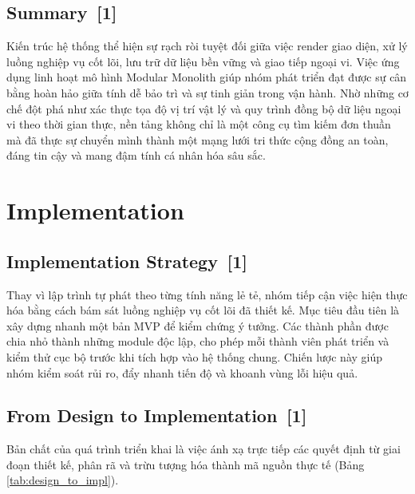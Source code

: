 \documentclass[12pt, a4paper]{article}
\begin{document}
\subsection[Summary]{Summary \,{\normalfont\small\textcolor{cyan!70!black}{[1]}}}
Kiến trúc hệ thống thể hiện sự rạch ròi tuyệt đối giữa việc render giao diện, xử lý luồng nghiệp vụ cốt lõi, lưu trữ dữ liệu bền vững và giao tiếp ngoại vi. Việc ứng dụng linh hoạt mô hình Modular Monolith giúp nhóm phát triển đạt được sự cân bằng hoàn hảo giữa tính dễ bảo trì và sự tinh giản trong vận hành. Nhờ những cơ chế đột phá như xác thực tọa độ vị trí vật lý và quy trình đồng bộ dữ liệu ngoại vi theo thời gian thực, nền tảng không chỉ là một công cụ tìm kiếm đơn thuần mà đã thực sự chuyển mình thành một mạng lưới tri thức cộng đồng an toàn, đáng tin cậy và mang đậm tính cá nhân hóa sâu sắc.
\section{Implementation}

\subsection[Implementation Strategy]{Implementation Strategy \,{\normalfont\small\textcolor{cyan!70!black}{[1]}}}
Thay vì lập trình tự phát theo từng tính năng lẻ tẻ, nhóm tiếp cận việc hiện thực hóa bằng cách bám sát luồng nghiệp vụ cốt lõi đã thiết kế. Mục tiêu đầu tiên là xây dựng nhanh một bản MVP để kiểm chứng ý tưởng. Các thành phần được chia nhỏ thành những module độc lập, cho phép mỗi thành viên phát triển và kiểm thử cục bộ trước khi tích hợp vào hệ thống chung. Chiến lược này giúp nhóm kiểm soát rủi ro, đẩy nhanh tiến độ và khoanh vùng lỗi hiệu quả.

\subsection[From Design to Implementation]{From Design to Implementation \,{\normalfont\small\textcolor{cyan!70!black}{[1]}}}
Bản chất của quá trình triển khai là việc ánh xạ trực tiếp các quyết định từ giai đoạn thiết kế, phân rã và trừu tượng hóa thành mã nguồn thực tế (Bảng \ref{tab:design_to_impl}).
\end{document}
